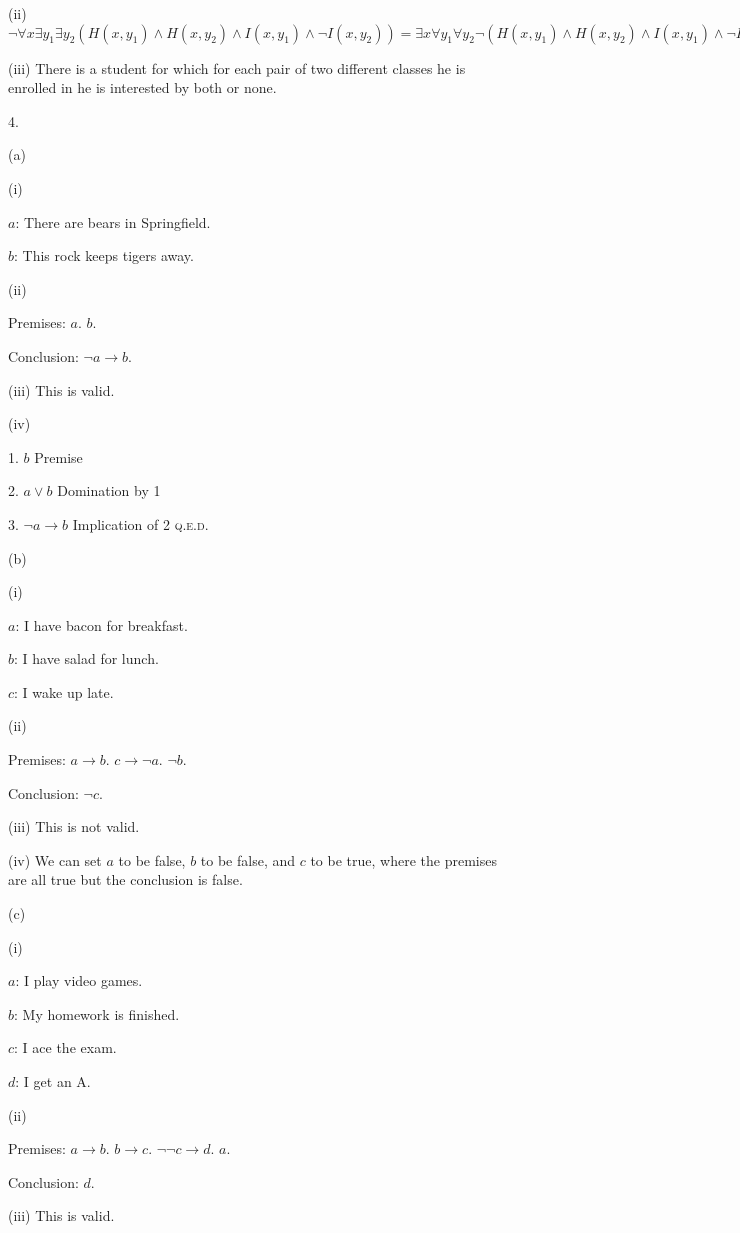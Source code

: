 \documentclass[UTF8,12pt,letterpaper,oneside]{amsart}
\begin{document}
(ii) $\lnot \forall x \exists y_1 \exists y_2 (H(x, y_1) \land H(x, y_2) \land I(x, y_1) \land \lnot I(x, y_2)) = \exists x \forall y_1 \forall y_2 \lnot(H(x, y_1) \land H(x, y_2) \land I(x, y_1) \land \lnot I(x, y_2))$

(iii) There is a student for which for each pair of two different classes he is enrolled in he is interested by both or none.

4.

(a) 

(i)

$a$: There are bears in Springfield.

$b$: This rock keeps tigers away.

(ii) 

Premises: $a$. $b$.

Conclusion: $\lnot a \rightarrow b$.

(iii) This is valid.

(iv)

1. $b$ Premise

2. $a \lor b$ Domination by 1

3. $\lnot a \rightarrow b$ Implication of 2 \hfill \textsc{q.e.d.}

(b)

(i)

$a$: I have bacon for breakfast.

$b$: I have salad for lunch.

$c$: I wake up late.

(ii)

Premises: $a \rightarrow b$. $c \rightarrow \lnot a$. $\lnot b$.

Conclusion: $\lnot c$.

(iii) This is not valid.

(iv) We can set $a$ to be false, $b$ to be false, and $c$ to be true, where the premises are all true but the conclusion is false.

(c)

(i)

$a$: I play video games.

$b$: My homework is finished.

$c$: I ace the exam.

$d$: I get an A.

(ii)

Premises: $a \rightarrow b$. $b \rightarrow c$. $\lnot \lnot c \rightarrow d$. $a$.

Conclusion: $d$.

(iii) This is valid.
\end{document}

